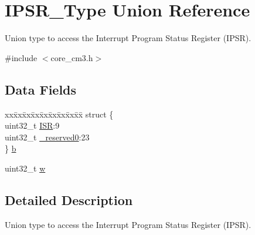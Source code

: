 \hypertarget{unionIPSR__Type}{\section{I\-P\-S\-R\-\_\-\-Type Union Reference}
\label{unionIPSR__Type}
}


Union type to access the Interrupt Program Status Register (I\-P\-S\-R).  




{\ttfamily \#include $<$core\-\_\-cm3.\-h$>$}

\subsection*{Data Fields}
\begin{DoxyCompactItemize}
\item 
\begin{tabbing}
xx\=xx\=xx\=xx\=xx\=xx\=xx\=xx\=xx\=\kill
struct \{\\
\>uint32\_t \hyperlink{unionIPSR__Type_ab46e5f1b2f4d17cfb9aca4fffcbb2fa5}{ISR}:9\\
\>uint32\_t \hyperlink{unionIPSR__Type_ad2eb0a06de4f03f58874a727716aa9aa}{\_reserved0}:23\\
\} \hyperlink{unionIPSR__Type_a2006d2ca6e88ca91ae1156fd750587de}{b}\\

\end{tabbing}\item 
uint32\-\_\-t \hyperlink{unionIPSR__Type_a4adca999d3a0bc1ae682d73ea7cfa879}{w}
\end{DoxyCompactItemize}


\subsection{Detailed Description}
Union type to access the Interrupt Program Status Register (I\-P\-S\-R). 

